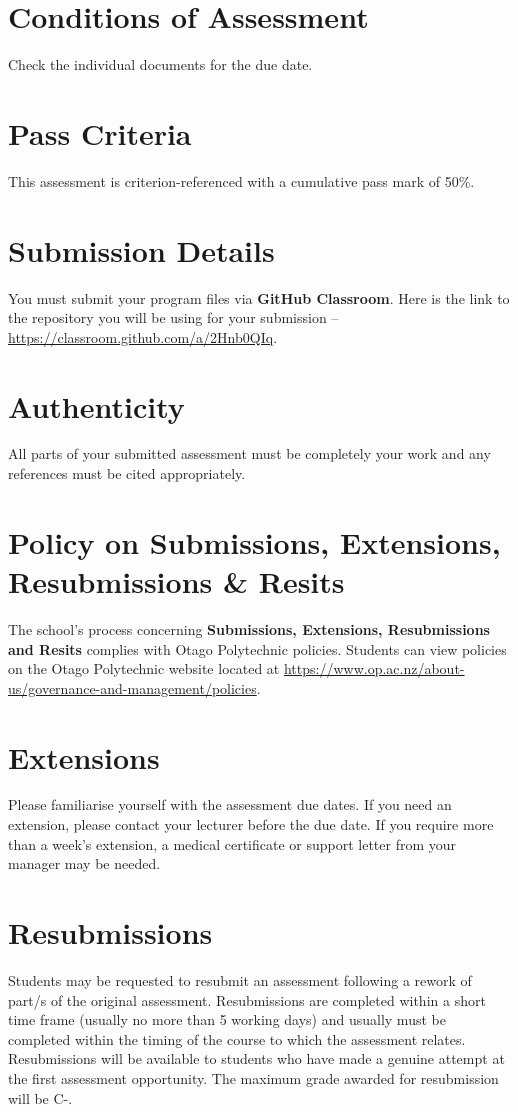 \documentclass{article}
\begin{document}
\section*{Conditions of Assessment}
Check the individual documents for the due date.

\section*{Pass Criteria}
This assessment is criterion-referenced with a cumulative pass mark of 50\%.

\section*{Submission Details}
You must submit your program files via \textbf{GitHub Classroom}. Here is the link to the repository you will be using for your submission – \href{https://classroom.github.com/a/2Hnb0QIq}{https://classroom.github.com/a/2Hnb0QIq}.

\section*{Authenticity}
All parts of your submitted assessment must be completely your work and any references must be cited appropriately.

\section*{Policy on Submissions, Extensions, Resubmissions \& Resits}
The school's process concerning \textbf{Submissions, Extensions, Resubmissions and Resits} complies with Otago Polytechnic policies. Students can view policies on the Otago Polytechnic website located at \href{https://www.op.ac.nz/about-us/governance-and-management/policies}{https://www.op.ac.nz/about-us/governance-and-management/policies}.

\section*{Extensions}
Please familiarise yourself with the assessment due dates. If you need an extension, please contact your lecturer before the due date. If you require more than a week's extension, a medical certificate or support letter from your manager may be needed.

\section*{Resubmissions}
Students may be requested to resubmit an assessment following a rework of part/s of the original assessment. Resubmissions are completed within a short time frame (usually no more than 5 working days) and usually must be completed within the timing of the course to which the assessment relates. Resubmissions will be available to students who have made a genuine attempt at the first assessment opportunity. The maximum grade awarded for resubmission will be C-.
\end{document}
